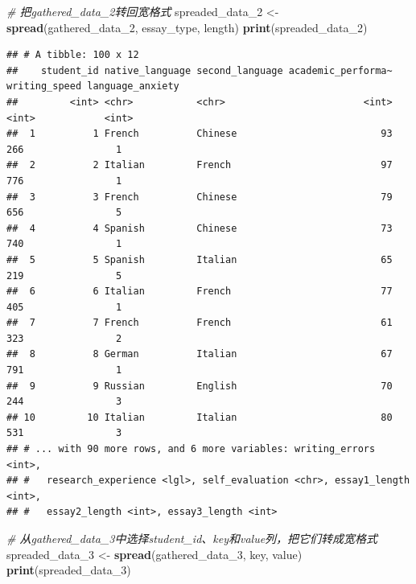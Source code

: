 \documentclass[]{book}
\newenvironment{Shaded}{\begin{snugshade}}{\end{snugshade}}
\newcommand{\CommentTok}[1]{\textcolor[rgb]{0.56,0.35,0.01}{\textit{#1}}}
\newcommand{\DecValTok}[1]{\textcolor[rgb]{0.00,0.00,0.81}{#1}}
\newcommand{\KeywordTok}[1]{\textcolor[rgb]{0.13,0.29,0.53}{\textbf{#1}}}
\newcommand{\NormalTok}[1]{#1}
\newcommand{\StringTok}[1]{\textcolor[rgb]{0.31,0.60,0.02}{#1}}
\begin{document}
\begin{Shaded}
\begin{Highlighting}[]
\CommentTok{# 把gathered_data_2转回宽格式}
\NormalTok{spreaded_data_}\DecValTok{2}\NormalTok{ <-}\StringTok{ }\KeywordTok{spread}\NormalTok{(gathered_data_}\DecValTok{2}\NormalTok{, essay_type, length)}
\KeywordTok{print}\NormalTok{(spreaded_data_}\DecValTok{2}\NormalTok{)}
\end{Highlighting}
\end{Shaded}

\begin{verbatim}
## # A tibble: 100 x 12
##    student_id native_language second_language academic_performa~ writing_speed language_anxiety
##         <int> <chr>           <chr>                        <int>         <int>            <int>
##  1          1 French          Chinese                         93           266                1
##  2          2 Italian         French                          97           776                1
##  3          3 French          Chinese                         79           656                5
##  4          4 Spanish         Chinese                         73           740                1
##  5          5 Spanish         Italian                         65           219                5
##  6          6 Italian         French                          77           405                1
##  7          7 French          French                          61           323                2
##  8          8 German          Italian                         67           791                1
##  9          9 Russian         English                         70           244                3
## 10         10 Italian         Italian                         80           531                3
## # ... with 90 more rows, and 6 more variables: writing_errors <int>,
## #   research_experience <lgl>, self_evaluation <chr>, essay1_length <int>,
## #   essay2_length <int>, essay3_length <int>
\end{verbatim}

\begin{Shaded}
\begin{Highlighting}[]
\CommentTok{# 从gathered_data_3中选择student_id、key和value列，把它们转成宽格式}
\NormalTok{spreaded_data_}\DecValTok{3}\NormalTok{ <-}\StringTok{ }\KeywordTok{spread}\NormalTok{(gathered_data_}\DecValTok{3}\NormalTok{, key, value)}
\KeywordTok{print}\NormalTok{(spreaded_data_}\DecValTok{3}\NormalTok{)}
\end{Highlighting}
\end{Shaded}
\end{document}
